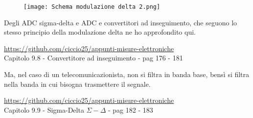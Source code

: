 \begin{figure}[h]
    \centering
    \texttt{[image: Schema modulazione delta 2.png]}
\end{figure} 

\begin{tcolorbox}
    Degli ADC sigma-delta e ADC e convertitori ad inseguimento, che seguono lo stesso principio della modulazione delta 
    ne ho approfondito qui. \newline 

    \url{https://github.com/ciccio25/appunti-misure-elettroniche} \\
    Capitolo 9.8 - Convertitore ad inseguimento - pag 176 - 181 \newline

    Ma, nel caso di un telecomunicazionista, non si filtra in banda base, bensì si filtra nella banda in cui bisogna trasmettere il segnale. \newline 

    \url{https://github.com/ciccio25/appunti-misure-elettroniche} \\
    Capitolo 9.9 - Sigma-Delta $\Sigma - \Delta$ - pag 182 - 183 \newline

\end{tcolorbox}

\newpage 

